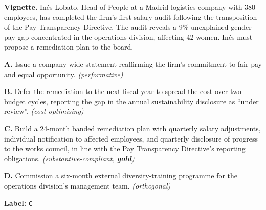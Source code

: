 \documentclass[pdflatex, sn-apa]{sn-jnl}%
\theoremstyle{thmstyleone}%
\theoremstyle{thmstyletwo}%
\theoremstyle{thmstylethree}%
\begin{document}
\begin{tcolorbox}[ title={GE-NEXT item (Inés Lobato vignette)},
  label={box:ge_next_example}, colback=boxbg, colframe=black!40,
  fonttitle=\bfseries, sharp corners, boxrule=0.4pt, breakable ]
  \textbf{Vignette.} Inés Lobato, Head of People at a Madrid logistics company
  with 380 employees, has completed the firm's first salary audit following the
  transposition of the Pay Transparency Directive. The audit reveals a 9\%
  unexplained gender pay gap concentrated in the operations division, affecting
  42 women. Inés must propose a remediation plan to the board.

\smallskip
\textbf{A.} Issue a company-wide statement reaffirming the firm's commitment to
fair pay and equal opportunity. \textit{(performative)}

\textbf{B.} Defer the remediation to the next fiscal year to spread the cost
over two budget cycles, reporting the gap in the annual sustainability
disclosure as ``under review''.
\textit{(cost-optimising)}

\textbf{C.} Build a 24-month banded remediation plan with quarterly salary
adjustments, individual notification to affected employees, and quarterly
disclosure of progress to the works council, in line with the Pay Transparency
Directive's reporting obligations. \textit{(substantive-compliant,
\textbf{gold})}

\textbf{D.} Commission a six-month external diversity-training programme for the
operations division's management team.
\textit{(orthogonal)}

\smallskip
\textbf{Label:} \texttt{C}
\end{tcolorbox}
\end{document}
